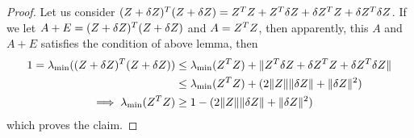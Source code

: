 \documentclass{article}
\begin{document}
\begin{proof}
    Let us consider $(Z + \delta Z)^{T}(Z + \delta Z) = Z^{T} Z + Z^{T}
    \delta Z + \delta Z^{T} Z + \delta Z ^{T} \delta Z$. If we let $A+E
    =(Z + \delta Z)^{T}(Z + \delta Z)$ and $A=Z^{T} Z$, then apparently,
    this $A$ and $A + E$ satisfies the condition of above lemma, then 
    \begin{equation}\notag
        \begin{aligned}
            1 = \lambda_{\min}((Z + \delta Z)^{T}(Z + \delta Z)) 
            & \leq \lambda_{\min}(Z^{T} Z) + \|{Z^{T}
            \delta Z + \delta Z^{T} Z + \delta Z ^{T} \delta Z}\| \\
            & \leq \lambda_{\min}(Z^{T} Z)  + 
            (2\|{Z}\|\|{\delta Z}\| + \|{\delta Z}\|^2) \\
            \implies \lambda_{\min}(Z^{T} Z) & \geq 
            1 - (2\|{Z}\|\|{\delta Z}\| + \|{\delta Z}\|^2)
        \end{aligned}
    \end{equation}
    which proves the claim.
\end{proof}




\end{document}
